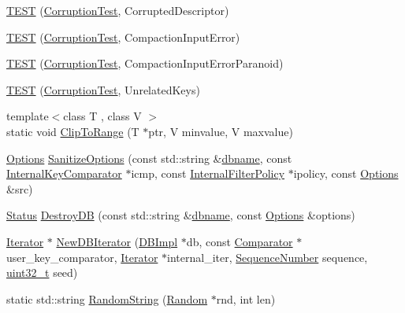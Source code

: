 \begin{DoxyCompactItemize}
\item 
\hyperlink{namespaceleveldb_ab52c022fc16dd83fe1c1c60745c9557c}{T\-E\-S\-T} (\hyperlink{classleveldb_1_1_corruption_test}{Corruption\-Test}, Corrupted\-Descriptor)
\item 
\hyperlink{namespaceleveldb_ac45d45675cfba0614b5788177b03e717}{T\-E\-S\-T} (\hyperlink{classleveldb_1_1_corruption_test}{Corruption\-Test}, Compaction\-Input\-Error)
\item 
\hyperlink{namespaceleveldb_a2bb2a098a32d42044e6be132020b29b0}{T\-E\-S\-T} (\hyperlink{classleveldb_1_1_corruption_test}{Corruption\-Test}, Compaction\-Input\-Error\-Paranoid)
\item 
\hyperlink{namespaceleveldb_adbafd76c895bbb400c6aa4ad6e0eae2e}{T\-E\-S\-T} (\hyperlink{classleveldb_1_1_corruption_test}{Corruption\-Test}, Unrelated\-Keys)
\item 
{\footnotesize template$<$class T , class V $>$ }\\static void \hyperlink{namespaceleveldb_aa571d50e762e410ba1558c7972800caa}{Clip\-To\-Range} (T $\ast$ptr, V minvalue, V maxvalue)
\item 
\hyperlink{structleveldb_1_1_options}{Options} \hyperlink{namespaceleveldb_aa4783e598841dca4393a97d360d10f56}{Sanitize\-Options} (const std\-::string \&\hyperlink{c__test_8c_a75d845559336df6843f3b599960f89d2}{dbname}, const \hyperlink{classleveldb_1_1_internal_key_comparator}{Internal\-Key\-Comparator} $\ast$icmp, const \hyperlink{classleveldb_1_1_internal_filter_policy}{Internal\-Filter\-Policy} $\ast$ipolicy, const \hyperlink{structleveldb_1_1_options}{Options} \&src)
\item 
\hyperlink{classleveldb_1_1_status}{Status} \hyperlink{namespaceleveldb_a5b0819d4d4adc2147b5e91a5553fd7dc}{Destroy\-D\-B} (const std\-::string \&\hyperlink{c__test_8c_a75d845559336df6843f3b599960f89d2}{dbname}, const \hyperlink{structleveldb_1_1_options}{Options} \&options)
\item 
\hyperlink{classleveldb_1_1_iterator}{Iterator} $\ast$ \hyperlink{namespaceleveldb_a0d4b256207f27afbf4ad03976fe0fae8}{New\-D\-B\-Iterator} (\hyperlink{classleveldb_1_1_d_b_impl}{D\-B\-Impl} $\ast$db, const \hyperlink{structleveldb_1_1_comparator}{Comparator} $\ast$user\-\_\-key\-\_\-comparator, \hyperlink{classleveldb_1_1_iterator}{Iterator} $\ast$internal\-\_\-iter, \hyperlink{namespaceleveldb_a5481ededd221c36d652c371249f869fa}{Sequence\-Number} sequence, \hyperlink{stdint_8h_a435d1572bf3f880d55459d9805097f62}{uint32\-\_\-t} seed)
\item 
static std\-::string \hyperlink{namespaceleveldb_ab30792c0730ee094943e8242577454af}{Random\-String} (\hyperlink{classleveldb_1_1_random}{Random} $\ast$rnd, int len)

\end{DoxyCompactItemize}
